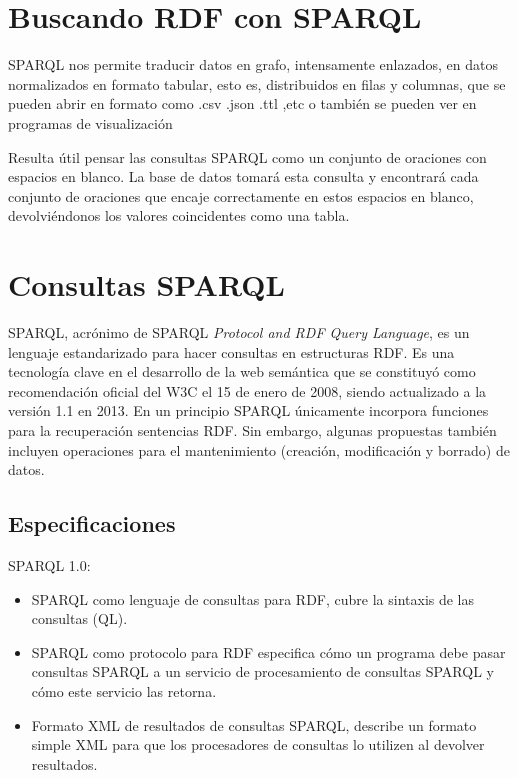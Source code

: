 \documentclass[conference]{IEEEtran}
\begin{document}
\vspace{0.2cm}

\section{Buscando RDF con SPARQL}
SPARQL nos permite traducir datos en grafo, intensamente enlazados, en datos normalizados en formato tabular, esto es, distribuidos en filas y columnas, que se pueden abrir  en formato como .csv .json .ttl ,etc o también se pueden ver en programas de visualización


Resulta útil pensar las consultas SPARQL como un conjunto de oraciones con espacios en blanco. La base de datos tomará esta consulta y encontrará cada conjunto de oraciones que encaje correctamente en estos espacios en blanco, devolviéndonos los valores coincidentes como una tabla.
\vspace{0.2cm}




\section{Consultas SPARQL}


SPARQL, acrónimo de SPARQL \textit{Protocol and RDF Query Language}, es un lenguaje estandarizado para hacer consultas en estructuras RDF.  Es una tecnología clave en el desarrollo de la web semántica que se constituyó como recomendación oficial del W3C el 15 de enero de 2008, siendo actualizado a la versión 1.1 en 2013\cite{b1}. En un principio SPARQL únicamente incorpora funciones para la recuperación sentencias RDF. Sin embargo, algunas propuestas también incluyen operaciones para el mantenimiento (creación, modificación y borrado) de datos.

\subsection{Especificaciones}

SPARQL 1.0:

\begin{itemize}
	\item SPARQL como lenguaje de consultas para RDF, cubre la sintaxis de las consultas (QL).
	\item SPARQL como protocolo para RDF especifica cómo un programa debe pasar consultas SPARQL a un servicio de procesamiento de consultas SPARQL y cómo este servicio las retorna. 
	\item Formato XML de resultados de consultas SPARQL, describe un formato simple XML para que los procesadores de consultas lo utilizen al devolver resultados.
	
\end{itemize}
\end{document}
